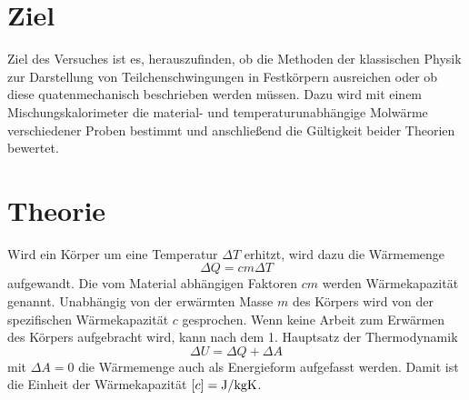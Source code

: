 \section{Ziel}

Ziel des Versuches ist es, herauszufinden, ob die Methoden der klassischen Physik zur Darstellung von Teilchenschwingungen in Festkörpern ausreichen oder ob diese quatenmechanisch beschrieben werden müssen. Dazu wird mit einem Mischungskalorimeter die material- und temperaturunabhängige Molwärme verschiedener Proben bestimmt und anschließend die Gültigkeit beider Theorien bewertet.
\section{Theorie}
\label{sec:Theorie}

Wird ein Körper  um eine Temperatur $\Delta{T}$ erhitzt, wird dazu die Wärmemenge 
\begin{equation}
\Delta{Q}=c m \Delta{T}
\label{eq:waermekapazitaet}
\end{equation}
aufgewandt. Die vom Material abhängigen Faktoren $c m$ werden Wärmekapazität genannt. 
Unabhängig von der erwärmten Masse $m$ des Körpers wird von der spezifischen Wärmekapazität $c$ gesprochen.
Wenn keine Arbeit zum Erwärmen des Körpers aufgebracht wird, kann nach dem 1. Hauptsatz der Thermodynamik
\begin{equation}
	\Delta{U}=\Delta{Q}+\Delta{A}
	\label{eq:hs_1}
\end{equation}
mit $\Delta{A}=0$ die Wärmemenge auch als Energieform aufgefasst werden. 
Damit ist die Einheit der Wärmekapazität $[c]=\si{\joule\per{\kilo\gram\kelvin}}$.

